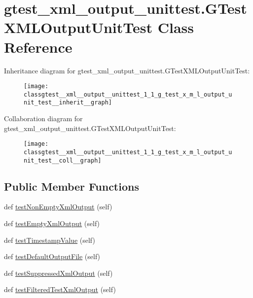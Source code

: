 \hypertarget{classgtest__xml__output__unittest_1_1_g_test_x_m_l_output_unit_test}{}\section{gtest\+\_\+xml\+\_\+output\+\_\+unittest.\+G\+Test\+X\+M\+L\+Output\+Unit\+Test Class Reference}
\label{classgtest__xml__output__unittest_1_1_g_test_x_m_l_output_unit_test}


Inheritance diagram for gtest\+\_\+xml\+\_\+output\+\_\+unittest.\+G\+Test\+X\+M\+L\+Output\+Unit\+Test\+:
\nopagebreak
\begin{figure}[H]
\begin{center}
\leavevmode
\texttt{[image: classgtest\_\_xml\_\_output\_\_unittest\_1\_1\_g\_test\_x\_m\_l\_output\_unit\_test\_\_inherit\_\_graph]}
\end{center}
\end{figure}


Collaboration diagram for gtest\+\_\+xml\+\_\+output\+\_\+unittest.\+G\+Test\+X\+M\+L\+Output\+Unit\+Test\+:
\nopagebreak
\begin{figure}[H]
\begin{center}
\leavevmode
\texttt{[image: classgtest\_\_xml\_\_output\_\_unittest\_1\_1\_g\_test\_x\_m\_l\_output\_unit\_test\_\_coll\_\_graph]}
\end{center}
\end{figure}
\subsection*{Public Member Functions}
\begin{DoxyCompactItemize}
\item 
def \mbox{\hyperlink{classgtest__xml__output__unittest_1_1_g_test_x_m_l_output_unit_test_a310c136c1eb2b421f57651a7d358b17a}{test\+Non\+Empty\+Xml\+Output}} (self)
\item 
def \mbox{\hyperlink{classgtest__xml__output__unittest_1_1_g_test_x_m_l_output_unit_test_a9602f91fe2e9d1e09171a032e94a5619}{test\+Empty\+Xml\+Output}} (self)
\item 
def \mbox{\hyperlink{classgtest__xml__output__unittest_1_1_g_test_x_m_l_output_unit_test_a828521a7ae57f650e1e9ca4beb34336a}{test\+Timestamp\+Value}} (self)
\item 
def \mbox{\hyperlink{classgtest__xml__output__unittest_1_1_g_test_x_m_l_output_unit_test_a01ca66e14468028e5c4eb809987113cf}{test\+Default\+Output\+File}} (self)
\item 
def \mbox{\hyperlink{classgtest__xml__output__unittest_1_1_g_test_x_m_l_output_unit_test_ac6df46d6831892e4c14dbdfae0049618}{test\+Suppressed\+Xml\+Output}} (self)
\item 
def \mbox{\hyperlink{classgtest__xml__output__unittest_1_1_g_test_x_m_l_output_unit_test_a572b6d49e8f4d646ebdadcced3d260ef}{test\+Filtered\+Test\+Xml\+Output}} (self)
\end{DoxyCompactItemize}
